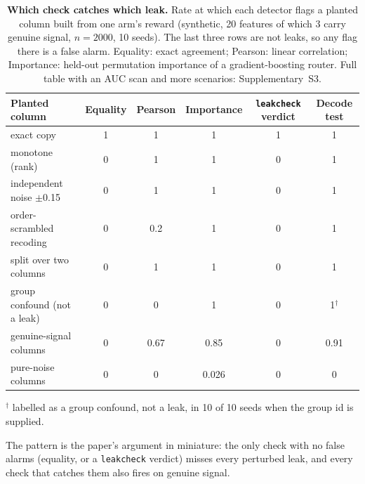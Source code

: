 \documentclass{article}
\begin{document}
\begin{table}[t]
\centering
\small
\caption{\textbf{Which check catches which leak.} Rate at which each detector flags a planted column
built from one arm's reward (synthetic, 20 features of which 3 carry genuine signal, $n{=}2000$, 10
seeds). The last three rows are not leaks, so any flag there is a false alarm. Equality: exact
agreement; Pearson: linear correlation; Importance: held-out permutation importance of a
gradient-boosting router. Full table with an AUC scan and more scenarios: Supplementary~S3.}
\label{tab:bench}
\begin{tabular}{lccccc}
\toprule
Planted column & Equality & Pearson & Importance & \texttt{leakcheck} verdict & Decode test \\
\midrule
exact copy                     & 1 & 1   & 1    & 1 & 1 \\
monotone (rank)                & 0 & 1   & 1    & 0 & 1 \\
independent noise $\pm$0.15    & 0 & 1   & 1    & 0 & 1 \\
order-scrambled recoding       & 0 & 0.2 & 1    & 0 & 1 \\
split over two columns         & 0 & 1   & 1    & 0 & 1 \\
\midrule
group confound (not a leak)    & 0 & 0   & 1    & 0 & 1$^\dagger$ \\
genuine-signal columns         & 0 & 0.67 & 0.85 & 0 & 0.91 \\
pure-noise columns             & 0 & 0   & 0.026 & 0 & 0 \\
\bottomrule
\end{tabular}

{\footnotesize $^\dagger$ labelled as a group confound, not a leak, in 10 of 10 seeds when the group id is supplied.}
\end{table}

The pattern is the paper's argument in miniature: the only check with no false alarms
(equality, or a \texttt{leakcheck} verdict) misses every perturbed leak, and every check that
catches them also fires on genuine signal.
\end{document}
